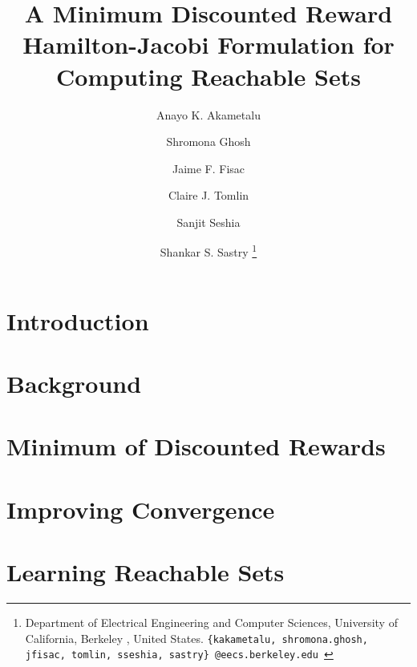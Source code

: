 \documentclass[letterpaper, 10 pt, journal]{ieeeconf}
\title{\LARGE \bf
A Minimum Discounted Reward Hamilton-Jacobi Formulation for Computing Reachable Sets 
}
\author{
Anayo K. Akametalu \and Shromona Ghosh \and Jaime F. Fisac \and Claire J. Tomlin \and Sanjit Seshia \and Shankar S. Sastry
\thanks{
 Department of Electrical Engineering and Computer Sciences, 
        University of California, Berkeley , United States.\newline
        {\tt\small \{kakametalu, shromona.ghosh, jfisac, tomlin, sseshia, sastry\}~@eecs.berkeley.edu }}%
}
\begin{document}
\maketitle
\thispagestyle{empty}
\pagestyle{empty}



\section{Introduction \label{sec:intro}}


\section{Background \label{sec:back}} 


\section {Minimum of Discounted Rewards \label{sec:mdr}}


\section{Improving Convergence \label{sec:conv}}


\section{Learning Reachable Sets \label{sec:learn}}

\end{document}
